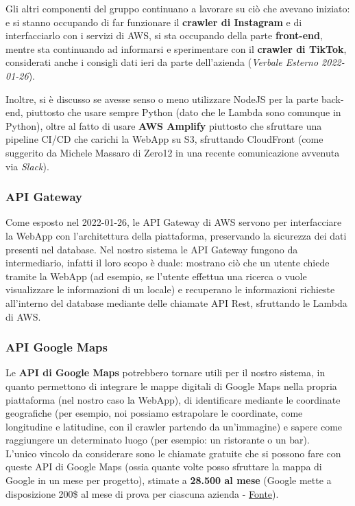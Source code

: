 Gli altri componenti del gruppo continuano a lavorare su ciò che avevano iniziato: \FP{} e \MB{} si stanno occupando di far funzionare il \textbf{crawler di Instagram} e di interfacciarlo con i servizi di AWS, \GC{} si sta occupando della parte \textbf{front-end}, mentre \MG{} sta continuando ad informarsi e sperimentare con il \textbf{crawler di TikTok}, considerati anche i consigli dati ieri da parte dell'azienda (\textit{Verbale Esterno 2022-01-26}).

Inoltre, si è discusso se avesse senso o meno utilizzare NodeJS per la parte back-end, piuttosto che usare sempre Python (dato che le Lambda sono comunque in Python), oltre al fatto di usare \textbf{AWS Amplify} piuttosto che sfruttare una pipeline CI/CD che carichi la WebApp su S3, sfruttando CloudFront (come suggerito da Michele Massaro di Zero12 in una recente comunicazione avvenuta via \textit{Slack}).

\subsubsection{API Gateway}

Come esposto nel \Ve{} 2022-01-26, le API Gateway di AWS servono per interfacciare la WebApp con l'architettura della piattaforma, preservando la sicurezza dei dati presenti nel database. Nel nostro sistema le API Gateway fungono da intermediario, infatti il loro scopo è duale: mostrano ciò che un utente chiede tramite la WebApp (ad esempio, se l'utente effettua una ricerca o vuole visualizzare le informazioni di un locale) e recuperano le informazioni richieste all'interno del database mediante delle chiamate API Rest, sfruttando le Lambda di AWS.

\subsubsection{API Google Maps}
 
Le \textbf{API di Google Maps} potrebbero tornare utili per il nostro sistema, in quanto permettono di integrare le mappe digitali di Google Maps nella propria piattaforma (nel nostro caso la WebApp), di identificare mediante le coordinate geografiche (per esempio, noi possiamo estrapolare le coordinate, come longitudine e latitudine, con il crawler partendo da un'immagine) e sapere come raggiungere un determinato luogo (per esempio: un ristorante o un bar). \\
L'unico vincolo da considerare sono le chiamate gratuite che si possono fare con queste API di Google Maps (ossia quante volte posso sfruttare la mappa di Google in un mese per progetto), stimate a \textbf{28.500 al mese} (Google mette a disposizione 200\$ al mese di prova per ciascuna azienda - \color{blue}  \underline{\href{https://mapsplatform.google.com/pricing/}{Fonte}}\color{black}).  

